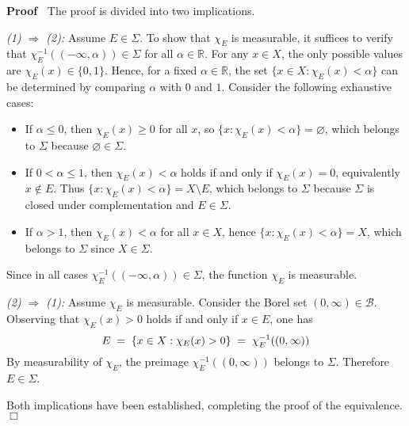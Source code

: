 \documentclass{article}
\newcommand{\nin}{\not\in}
\newcommand{\tmem}[1]{{\em #1\/}}
\newenvironment{proof}{\noindent\textbf{Proof\ }}{\hspace*{\fill}$\Box$\medskip}
\newcommand{\R}{\mathbb{R}}
\newcommand{\B}{\mathcal{B}}
\newcommand{\Sig}{\Sigma}
\begin{document}
\begin{proof}
  The proof is divided into two implications.
  
  {\noindent}{\tmem{(1) $\Rightarrow$ (2):}} Assume $E \in \Sig$. To show that
  $\chi_E$ is measurable, it suffices to verify that $\chi_E^{- 1} ((- \infty,
  \alpha)) \in \Sig$ for all $\alpha \in \R$. For any $x \in X$, the only
  possible values are $\chi_E (x) \in \{0, 1\}$. Hence, for a fixed $\alpha
  \in \R$, the set $\{x \in X : \chi_E (x) < \alpha\}$ can be determined by
  comparing $\alpha$ with $0$ and $1$. Consider the following exhaustive
  cases:
  \begin{itemize}
    \item If $\alpha \le 0$, then $\chi_E (x) \ge 0$ for all $x$, so $\{x :
    \chi_E (x) < \alpha\} = \varnothing$, which belongs to $\Sig$ because
    $\varnothing \in \Sig$.
    
    \item If $0 < \alpha \le 1$, then $\chi_E (x) < \alpha$ holds if and only
    if $\chi_E (x) = 0$, equivalently $x \nin E$. Thus $\{x : \chi_E (x) <
    \alpha\} = X \setminus E$, which belongs to $\Sig$ because $\Sig$ is
    closed under complementation and $E \in \Sig$.
    
    \item If $\alpha > 1$, then $\chi_E (x) < \alpha$ for all $x \in X$, hence
    $\{x : \chi_E (x) < \alpha\} = X$, which belongs to $\Sig$ since $X \in
    \Sig$.
  \end{itemize}
  Since in all cases $\chi_E^{- 1} ((- \infty, \alpha)) \in \Sig$, the
  function $\chi_E$ is measurable.
  
  {\noindent}{\tmem{(2) $\Rightarrow$ (1):}} Assume $\chi_E$ is measurable.
  Consider the Borel set $(0, \infty) \in \B$. Observing that $\chi_E (x) > 0$
  holds if and only if $x \in E$, one has
  \begin{equation}
    E \hspace{0.27em} = \hspace{0.27em} \{x \in X : \chi_E (x) > 0\}
    \hspace{0.27em} = \hspace{0.27em} \chi_E^{- 1} ((0, \infty))
  \end{equation}
  By measurability of $\chi_E$, the preimage $\chi_E^{- 1} ((0, \infty))$
  belongs to $\Sig$. Therefore $E \in \Sig$.
  
  Both implications have been established, completing the proof of the
  equivalence.
\end{proof}
\end{document}
